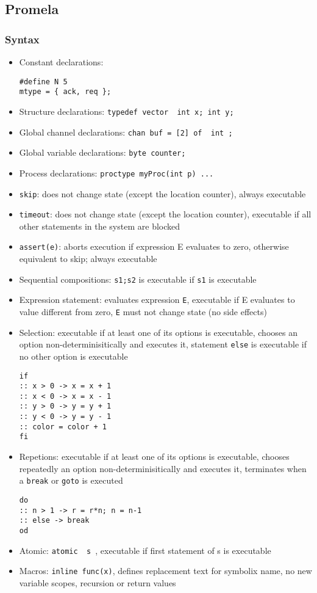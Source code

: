 \documentclass[11.5pt]{article}
\begin{document}
\subsection{Promela}
\subsubsection{Syntax}
\begin{itemize}
    \item Constant declarations: 
    \begin{verbatim}
#define N 5
mtype = { ack, req };
    \end{verbatim}
    \item Structure declarations: \texttt{typedef vector { int x; int y};}
    \item Global channel declarations: \texttt{chan buf = [2] of { int };}
    \item Global variable declarations: \texttt{byte counter;}
    \item Process declarations: \texttt{proctype myProc(int p) {...}}
    \item \texttt{skip}: does not change state (except the location counter), always executable
    \item \texttt{timeout}: does not change state (except the location counter), executable if all other statements in the system are blocked
    \item \texttt{assert(e)}: aborts execution if expression E evaluates to zero, otherwise equivalent to skip; always executable
    \item Sequential compositions: \texttt{s1;s2} is executable if \texttt{s1} is executable
    \item Expression statement: evaluates expression \texttt{E}, executable if E evaluates to value different from zero,
    \texttt{E} must not change state (no side effects)
    \item Selection: executable if at least one of its options is executable, chooses an option non-determinisitically and executes it, 
    statement \texttt{else} is executable if no other option is executable
\begin{verbatim}
if
:: x > 0 -> x = x + 1
:: x < 0 -> x = x - 1
:: y > 0 -> y = y + 1
:: y < 0 -> y = y - 1
:: color = color + 1
fi
\end{verbatim}
    \item Repetions: executable if at least one of its options is executable, chooses repeatedly an option non-determinisitically and executes it, 
    terminates when a \texttt{break} or \texttt{goto} is executed
\begin{verbatim}
do
:: n > 1 -> r = r*n; n = n-1
:: else -> break
od
\end{verbatim}
    \item Atomic: \texttt{atomic { s }}, executable if first statement of s is executable
    \item Macros: \texttt{inline func(x){}}, defines replacement text for symbolix name, no new variable scopes, recursion or return values
\end{itemize}
\end{document}
